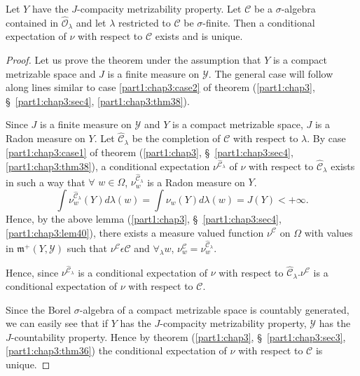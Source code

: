 \begin{thm}\label{part1:chap3:thm41}
Let $Y$ have the $J$-compacity metrizability property. Let
$\mathscr{C}$ be a $\sigma$-algebra contained in
$\hat{\mathscr{O}}_\lambda$ and let $\lambda$ restricted to
$\mathscr{C}$ be $\sigma$-finite. Then a conditional expectation of
$\nu$ with respect to $\mathscr{C}$ exists and is unique. 
\end{thm}

\begin{proof}
Let us prove the theorem under the assumption that $Y$ is a compact
metrizable space and $J$ is a finite measure on $\mathscr{Y}$. The
general case will follow along lines similar to case
\ref{part1:chap3:case2} of theorem (\ref{part1:chap3},
\S\ \ref{part1:chap3:sec4}, \ref{part1:chap3:thm38}). 

Since $J$ is a finite measure on $\mathscr{Y}$ and $Y$ is a compact
metrizable space, $J$ is a Radon measure on $Y$. Let
$\hat{\mathscr{C}}_\lambda$ be the completion of $\mathscr{C}$ with
respect to $\lambda$. By case \ref{part1:chap3:case1} of theorem
(\ref{part1:chap3}, \S\ \ref{part1:chap3:sec4}, \ref{part1:chap3:thm38}), a 
conditional expectation $\nu^{\hat{\mathscr{C}}_\lambda}$ of $\nu$
with respect to $\hat{\mathscr{C}}_\lambda$ exists in such a way that
$\forall$ $w \in\Omega$, $\nu^{\hat{\mathscr{C}}_\lambda}_w$ is a
Radon measure on $Y$. 
$$
\int \nu^{\hat{\mathscr{C}}_\lambda}_w (Y) d \lambda (w) = \int \nu_w
(Y) d \lambda (w) = J(Y) < + \infty. 
$$\pageoriginale
Hence, by the above lemma (\ref{part1:chap3},
\S\ \ref{part1:chap3:sec4}, \ref{part1:chap3:lem40}), there exists a
measure 
valued function $\nu^\mathscr{C}$ on $\Omega$ with values in
$\mathfrak{m}^+ (Y, \mathscr{Y})$ such that $\nu^\mathscr{C}\epsilon
\mathscr{C}$ and $\forall_\lambda w$, $\nu^\mathscr{C}_w =
\nu^{\hat{\mathscr{C}}_\lambda}_w$. 

Hence, since $\nu^{\hat{\mathscr{C}}_\lambda}$ is a conditional
expectation of $\nu$ with respect to $\hat{\mathscr{C}}_\lambda
. \nu^\mathscr{C}$ is a conditional expectation of $\nu$ with respect
to $\mathscr{C}$. 


Since the Borel $\sigma$-algebra of a compact metrizable space is
countably generated, we can easily see that if $Y$ has the
$J$-compacity metrizability property, $\mathscr{Y}$ has the
$J$-countability property. Hence by theorem (\ref{part1:chap3},
\S\ \ref{part1:chap3:sec3}, \ref{part1:chap3:thm36}) the 
conditional expectation of $\nu$ with respect to $\mathscr{C}$ is
unique. 
\end{proof}


